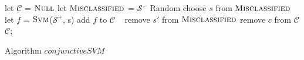 \begin{algorithm}[!h]
\SetAlgoVlined
\Indm
{}
\Indp
    let $\mathcal{C}$ = $\textsc{Null}$\;
    let $\textsc{Misclassified}$ = $\mathcal{S}^-$\;
     {
        Random choose $s$ from $\textsc{Misclassified}$\;
        let $f$ = $\textsc{Svm}$($\mathcal{S}^+$, s)\;
        add $f$ to $\mathcal{C}$\;
         {\
             {
                remove $s'$ from $\textsc{Misclassified}$\;
            }
        }
    }
     {
         {
            remove $c$ from $\mathcal{C}$\;
        }
    }
    \Return $\mathcal{C}$;
\caption{Algorithm $conjunctiveSVM$}
\label{alg:conjunctiveSVM}
\end{algorithm}






